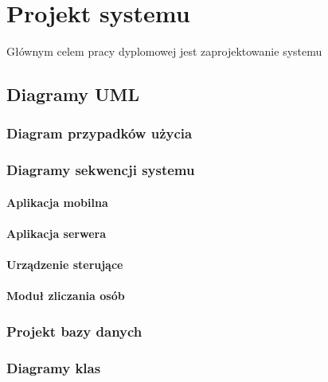 % 
\newpage\section{Projekt systemu \textsl{\NazwaSys}}\label{sec:projekt}
Głównym celem pracy dyplomowej jest zaprojektowanie systemu 

\subsection{Diagramy UML}

	\subsubsection{Diagram przypadków użycia}
	
		
	\subsubsection{Diagramy sekwencji systemu}
	
		\paragraph{Aplikacja mobilna}
		\paragraph{Aplikacja serwera}
		\paragraph{Urządzenie sterujące}
		\paragraph{Moduł zliczania osób}
		
	\subsubsection{Projekt bazy danych} 
	
	\subsubsection{Diagramy klas} 
	
